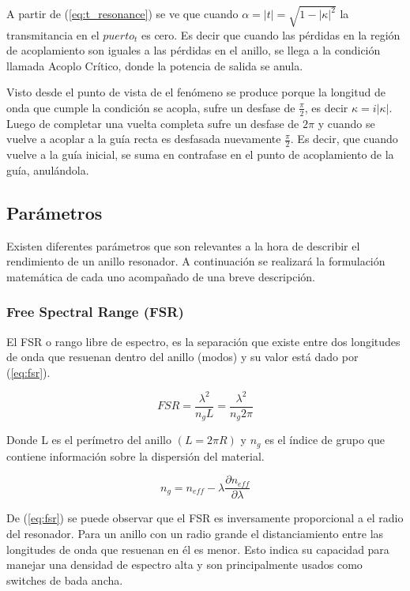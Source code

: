 A partir de (\ref{eq:t_resonance}) se ve que cuando $\alpha=|t|=\sqrt{1-|\kappa|^2}$ la transmitancia
en el $puerto_t$ es cero. Es decir que cuando las pérdidas en la región de 
acoplamiento son iguales a las pérdidas en el anillo, se llega a la condición
llamada Acoplo Crítico, donde la potencia de salida se anula.

Visto desde el punto de vista de \cite{blasco2011desarrollo} el fenómeno se 
produce porque la longitud de onda que cumple la condición se acopla, sufre un 
desfase de $\frac{\pi}{2}$, es decir $\kappa = i|\kappa|$. 
Luego de completar una vuelta completa sufre un desfase de $2\pi$ y cuando
se vuelve a acoplar a la guía recta es desfasada nuevamente $\frac{\pi}{2}$.
Es decir, que cuando vuelve a la guía inicial, se suma en contrafase en el 
punto de acoplamiento de la guía, anulándola.

\subsection{Parámetros}

Existen diferentes parámetros que son relevantes a la hora de describir el rendimiento
de un anillo resonador. A continuación se realizará la formulación matemática de 
cada uno acompañado de una breve descripción.

\subsubsection{Free Spectral Range (FSR)}
El FSR o rango libre de espectro, es la separación que existe entre dos longitudes
de onda que resuenan dentro del anillo (modos) y su valor está dado por (\ref{eq:fsr}).

\begin{equation}
FSR=\frac{\lambda^2}{n_g L} = \frac{\lambda^2}{n_g 2\pi} 
\label{eq:fsr}
\end{equation} 

Donde L es el perímetro del anillo $(L=2\pi R)$ y $n_g$ es el índice de grupo que contiene información sobre la dispersión del material.

\begin{equation}
n_g=n_{eff} - \lambda \frac{\partial n_{eff}}{\partial \lambda}
\label{eq:ng}
\end{equation} 

De (\ref{eq:fsr}) se puede observar que el FSR es inversamente proporcional a el 
radio del resonador. Para un anillo con un radio grande el distanciamiento
entre las longitudes de onda que resuenan en él es menor. Esto indica su capacidad
para manejar una densidad de espectro alta y son principalmente usados como switches
de bada ancha. 

